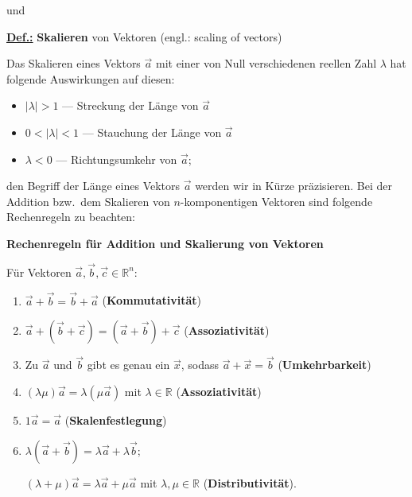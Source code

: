 \medskip
\noindent
und

\medskip
\noindent
\underline{\bf Def.:}
{\bf Skalieren} von Vektoren (engl.: scaling of vectors)
%
\be
{}
\ee
%

\medskip
\noindent
Das Skalieren eines Vektors $\vec{a}$ mit einer von Null
verschiedenen reellen Zahl $\lambda$ hat folgende Auswirkungen
auf diesen:
\begin{itemize}
	\item $|\lambda| > 1$ --- Streckung der L\"ange von $\vec{a}$
	\item $0 < |\lambda| < 1$ --- Stauchung der L\"ange von
	$\vec{a}$
	\item $\lambda < 0$ --- Richtungsumkehr von $\vec{a}$;
\end{itemize}
den Begriff der L\"ange eines Vektors $\vec{a}$ werden wir
in K\"urze pr\"azisieren. Bei der Addition bzw.\ dem
Skalieren von $n$-komponentigen Vektoren sind folgende
Rechenregeln zu beachten:

\medskip
\noindent
{\bf Rechenregeln f\"ur Addition und Skalierung
von Vektoren}

\noindent
F\"ur Vektoren
$\vec{a}, \vec{b}, \vec{c} \in {\mathbb R}^{n}$:

\begin{enumerate}
	\item $\vec{a}+\vec{b} = \vec{b}+\vec{a}$
	\hfill ({\bf Kommutativit\"at})
	\item $\vec{a}+(\vec{b}+\vec{c}) = (\vec{a}+\vec{b})+\vec{c}$
	\hfill ({\bf Assoziativit\"at})
	\item Zu $\vec{a}$ und $\vec{b}$ gibt es genau ein $\vec{x}$,
	sodass $\vec{a}+\vec{x}=\vec{b}$ \hfill ({\bf Umkehrbarkeit})
	\item $(\lambda\mu)\vec{a}=\lambda(\mu\vec{a})$ mit $\lambda
	\in {\mathbb R}$ \hfill ({\bf Assoziativit\"at})
	\item $1\vec{a}=\vec{a}$ \hfill ({\bf Skalenfestlegung})
	\item $\lambda(\vec{a}+\vec{b}) = \lambda\vec{a}+\lambda\vec{b}$;
	
	$(\lambda+\mu)\vec{a} = \lambda\vec{a}+\mu\vec{a}$ mit $\lambda,
	\mu	\in {\mathbb R}$ \hfill ({\bf Distributivit\"at}).
\end{enumerate}


